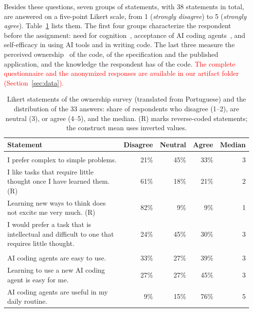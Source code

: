 \documentclass[conference]{IEEEtran}
\begin{document}
Besides these questions, seven groups of statements, with 38 statements in total, are answered on a five-point Likert scale, from 1 (\emph{strongly disagree}) to 5 (\emph{strongly agree}). Table~\ref{tab:survey} lists them. The first four groups characterize the respondent before the assignment: need for cognition~\cite{cacioppo1982}, acceptance of AI coding agents~\cite{davis1989}, and self-efficacy in using AI tools and in writing code. The last three measure the perceived ownership~\cite{pierce2001} of the code, of the specification and the published application, and the knowledge the respondent has of the code. \textcolor{red}{The complete questionnaire and the anonymized responses are available in our artifact folder (Section~\ref{sec:data}).}

\begin{table}[t]
\centering
\caption{Likert statements of the ownership survey (translated from Portuguese) and the distribution of the 33 answers: share of respondents who disagree (1--2), are neutral (3), or agree (4--5), and the median. (R) marks reverse-coded statements; the construct mean uses inverted values.}
\label{tab:survey}
\footnotesize
\renewcommand{\arraystretch}{1.05}
\begin{tabularx}{\textwidth}{@{}>{\raggedright\arraybackslash}X r r r r@{}}
\toprule
\textbf{Statement} & \textbf{Disagree} & \textbf{Neutral} & \textbf{Agree} & \textbf{Median} \\
\midrule
\multicolumn{5}{@{}l}{\textit{Need for cognition} ($\alpha = 0.13$; mean $= 3.52$, SD $= 0.58$)} \\
I prefer complex to simple problems. & 21\% & 45\% & 33\% & 3 \\
I like tasks that require little thought once I have learned them. (R) & 61\% & 18\% & 21\% & 2 \\
Learning new ways to think does not excite me very much. (R) & 82\% & 9\% & 9\% & 1 \\
I would prefer a task that is intellectual and difficult to one that requires little thought. & 24\% & 45\% & 30\% & 3 \\
\midrule
\multicolumn{5}{@{}l}{\textit{Acceptance of AI coding agents} ($\alpha = 0.80$; mean $= 3.71$, SD $= 0.85$)} \\
AI coding agents are easy to use. & 33\% & 27\% & 39\% & 3 \\
Learning to use a new AI coding agent is easy for me. & 27\% & 27\% & 45\% & 3 \\
AI coding agents are useful in my daily routine. & 9\% & 15\% & 76\% & 5 \\

\end{tabularx}
\end{table}
\end{document}
